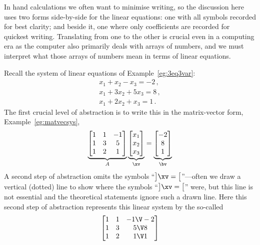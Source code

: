 In hand calculations we often want to minimise writing, so the discussion here uses two forms side-by-side for the linear equations: one with all symbols recorded for best clarity; and beside it, one where only coefficients are recorded for quickest writing.
Translating from one to the other is crucial even in a computing era as the computer also primarily deals with arrays of numbers, and we must interpret what those arrays of numbers mean in terms of linear equations.

\begin{example} \label{eg:}
Recall the system of linear equations of Example~\ref{eg:3eq3var}:
\begin{equation*}
\begin{array}{l}
x_1+x_2-x_3=-2\,,\\
x_1+3x_2+5x_3=8\,,\\
x_1+2x_2+x_3=1\,.
\end{array}
\end{equation*}
The first crucial level of abstraction is to write this in the matrix-vector form, Example~\ref{eg:matvecsys},
\begin{equation*}
\underbrace{\begin{bmatrix} 1&1&-1\\ 1&3&5\\1&2&1 \end{bmatrix}}_A
\underbrace{\begin{bmatrix} x_1\\x_2\\x_3 \end{bmatrix}}_\xv
=\underbrace{\begin{bmatrix} -2\\8\\1 \end{bmatrix}}_\bv 
\end{equation*}
A second step of abstraction omits the symbols ``\(\big]\xv=\big[\)''---often we draw a vertical (dotted) line to show where the symbols ``\(\big]\xv=\big[\)'' were, but this line is not essential and the theoretical statements ignore such a drawn line.
Here this second step of abstraction represents this linear system by the so-called 
\begin{equation*}
\begin{bmatrix} 1&1&-1\V -2\\ 1&3&5\V 8\\1&2&1\V 1 \end{bmatrix}
\end{equation*}
\end{example}


